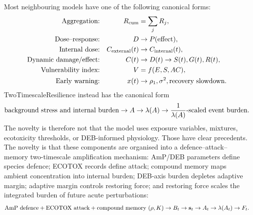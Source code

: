Most neighbouring models have one of the following canonical forms:
\begin{align}
  \hbox{Aggregation:} && R_{\mathrm{cum}} &= \sum_j R_j,\\
  \hbox{Dose--response:} && D &\rightarrow P(\hbox{effect}),\\
  \hbox{Internal dose:} && C_{\mathrm{external}}(t)&\rightarrow C_{\mathrm{internal}}(t),\\
  \hbox{Dynamic damage/effect:} && C(t)&\rightarrow D(t)\rightarrow S(t),G(t),R(t),\\
  \hbox{Vulnerability index:} && V&=f(E,S,AC),\\
  \hbox{Early warning:} && x(t)&\rightarrow \rho_1,\sigma^2,\hbox{recovery slowdown}.
\end{align}
TwoTimescaleResilience instead has the canonical form
\begin{equation}
  \hbox{background stress and internal burden}\rightarrow A\rightarrow\lambda(A)\rightarrow \frac{1}{\lambda(A)}\hbox{-scaled event burden}.
\end{equation}
The novelty is therefore not that the model uses exposure variables, mixtures, ecotoxicity thresholds, or DEB-informed physiology. Those have clear precedents. The novelty is that these components are organised into a defence--attack--memory two-timescale amplification mechanism: AmP/DEB parameters define species defence; ECOTOX records define attack; compound memory maps ambient concentration into internal burden; DEB-axis burden depletes adaptive margin; adaptive margin controls restoring force; and restoring force scales the integrated burden of future acute perturbations:
\begin{equation}
  \hbox{AmP defence} + \hbox{ECOTOX attack} + \hbox{compound memory }(\rho,K)
  \rightarrow B_t\rightarrow\mathbf{s}_t\rightarrow A_t\rightarrow\lambda(A_t)\rightarrow F_t.
\end{equation}




